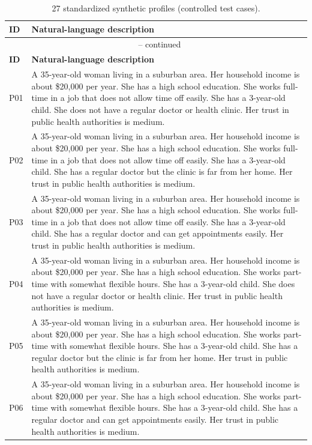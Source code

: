 \documentclass[11pt]{article}
\begin{document}
\begin{longtable}{p{1.2cm}p{12cm}}
\caption{27 standardized synthetic profiles (controlled test cases).}\label{tab:27profiles}\\
\toprule
\textbf{ID} & \textbf{Natural-language description} \\
\midrule
\endfirsthead
\multicolumn{2}{c}{{\tablename\ \thetable{} -- continued}} \\
\toprule
\textbf{ID} & \textbf{Natural-language description} \\
\midrule
\endhead
\bottomrule
\endfoot

P01 & A 35-year-old woman living in a suburban area. Her household income is about \$20,000 per year. She has a high school education. She works full-time in a job that does not allow time off easily. She has a 3-year-old child. She does not have a regular doctor or health clinic. Her trust in public health authorities is medium. \\
P02 & A 35-year-old woman living in a suburban area. Her household income is about \$20,000 per year. She has a high school education. She works full-time in a job that does not allow time off easily. She has a 3-year-old child. She has a regular doctor but the clinic is far from her home. Her trust in public health authorities is medium. \\
P03 & A 35-year-old woman living in a suburban area. Her household income is about \$20,000 per year. She has a high school education. She works full-time in a job that does not allow time off easily. She has a 3-year-old child. She has a regular doctor and can get appointments easily. Her trust in public health authorities is medium. \\
P04 & A 35-year-old woman living in a suburban area. Her household income is about \$20,000 per year. She has a high school education. She works part-time with somewhat flexible hours. She has a 3-year-old child. She does not have a regular doctor or health clinic. Her trust in public health authorities is medium. \\
P05 & A 35-year-old woman living in a suburban area. Her household income is about \$20,000 per year. She has a high school education. She works part-time with somewhat flexible hours. She has a 3-year-old child. She has a regular doctor but the clinic is far from her home. Her trust in public health authorities is medium. \\
P06 & A 35-year-old woman living in a suburban area. Her household income is about \$20,000 per year. She has a high school education. She works part-time with somewhat flexible hours. She has a 3-year-old child. She has a regular doctor and can get appointments easily. Her trust in public health authorities is medium. \\

\end{longtable}
\end{document}
